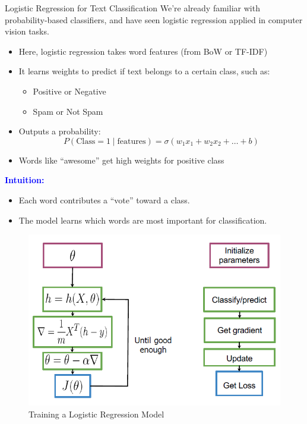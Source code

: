 \begin{frame}[allowframebreaks]{Logistic Regression for Text Classification}
    We’re already familiar with probability-based classifiers, and have seen logistic regression applied in computer vision tasks.

    \vspace{1em}
    \begin{itemize}
        \item Here, logistic regression takes word features (from BoW or TF-IDF)
        \item It learns weights to predict if text belongs to a certain class, such as:
        \begin{itemize}
            \item Positive or Negative
            \item Spam or Not Spam
        \end{itemize}
        \item Outputs a probability:
        \[
            P(\text{Class} = 1 \mid \text{features}) = \sigma(w_1x_1 + w_2x_2 + \ldots + b)
        \]
        \item Words like “awesome” get high weights for positive class
    \end{itemize}

    \framebreak
    \textcolor{blue}{\faBullseye\enspace \textbf{Intuition:}}
    \begin{itemize}
        \item Each word contributes a “vote” toward a class.
        \item The model learns which words are most important for classification.
    \end{itemize}

    \framrbreak
    \begin{figure}
        \centering
        \includegraphics[height=0.85\textheight, width=\textwidth, keepaspectratio]{images/nlp/training-lr.png}
        \caption*{Training a Logistic Regression Model}
    \end{figure}
\end{frame}

